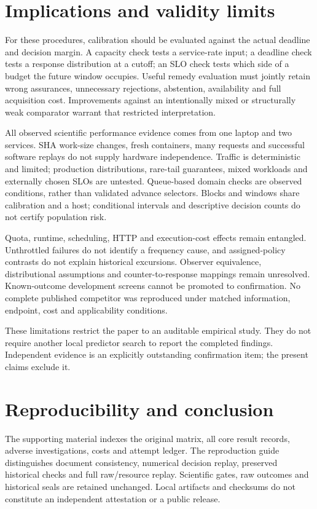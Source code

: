 \documentclass[10pt,a4paper]{article}
\begin{document}
\section{Implications and validity limits}

For these procedures, calibration should be evaluated against the actual deadline and decision margin. A capacity check tests a service-rate input; a deadline check tests a response distribution at a cutoff; an SLO check tests which side of a budget the future window occupies. Useful remedy evaluation must jointly retain wrong assurances, unnecessary rejections, abstention, availability and full acquisition cost. Improvements against an intentionally mixed or structurally weak comparator warrant that restricted interpretation.

All observed scientific performance evidence comes from one laptop and two services. SHA work-size changes, fresh containers, many requests and successful software replays do not supply hardware independence. Traffic is deterministic and limited; production distributions, rare-tail guarantees, mixed workloads and externally chosen SLOs are untested. Queue-based domain checks are observed conditions, rather than validated advance selectors. Blocks and windows share calibration and a host; conditional intervals and descriptive decision counts do not certify population risk.

Quota, runtime, scheduling, HTTP and execution-cost effects remain entangled. Unthrottled failures do not identify a frequency cause, and assigned-policy contrasts do not explain historical excursions. Observer equivalence, distributional assumptions and counter-to-response mappings remain unresolved. Known-outcome development screens cannot be promoted to confirmation. No complete published competitor was reproduced under matched information, endpoint, cost and applicability conditions.

These limitations restrict the paper to an auditable empirical study. They do not require another local predictor search to report the completed findings. Independent evidence is an explicitly outstanding confirmation item; the present claims exclude it.

\section{Reproducibility and conclusion}

The supporting material indexes the original matrix, all core result records, adverse investigations, costs and attempt ledger. The reproduction guide distinguishes document consistency, numerical decision replay, preserved historical checks and full raw/resource replay. Scientific gates, raw outcomes and historical seals are retained unchanged. Local artifacts and checksums do not constitute an independent attestation or a public release.
\end{document}
